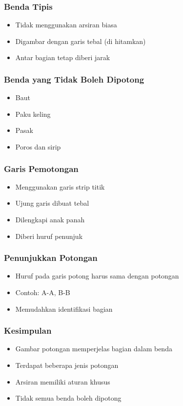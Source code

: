 \documentclass[../gbr_teknik.tex]{subfiles}
\begin{document}
\begin{frame}[mytitle=standard,t,mycolor=digiPH_cream,light]

	\frametitle{Benda Tipis}
	\begin{itemize}
		\item Tidak menggunakan arsiran biasa
		\item Digambar dengan garis tebal (di hitamkan)
		\item Antar bagian tetap diberi jarak
	\end{itemize}
\end{frame}

\begin{frame}[mytitle=standard,t,mycolor=digiPH_purple,dark]

	\frametitle{Benda yang Tidak Boleh Dipotong}
	\begin{itemize}
		\item Baut
		\item Paku keling
		\item Pasak
		\item Poros dan sirip
	\end{itemize}
\end{frame}

\begin{frame}[mytitle=standard,t,mycolor=digiPH_creamy,dark]

	\frametitle{Garis Pemotongan}
	\begin{itemize}
		\item Menggunakan garis strip titik
		\item Ujung garis dibuat tebal
		\item Dilengkapi anak panah
		\item Diberi huruf penunjuk
	\end{itemize}
\end{frame}

\begin{frame}[mytitle=standard,t,mycolor=digiPH_creamy,dark]
	\frametitle{Penunjukkan Potongan}
	\begin{itemize}
		\item Huruf pada garis potong harus sama dengan potongan
		\item Contoh: A-A, B-B
		\item Memudahkan identifikasi bagian
	\end{itemize}
\end{frame}

\begin{frame}[mytitle=standard,t,mycolor=digiPH_white,light]
	\frametitle{Kesimpulan}
	\begin{itemize}
		\item Gambar potongan memperjelas bagian dalam benda
		\item Terdapat beberapa jenis potongan
		\item Arsiran memiliki aturan khusus
		\item Tidak semua benda boleh dipotong
	\end{itemize}
\end{frame}
\end{document}
